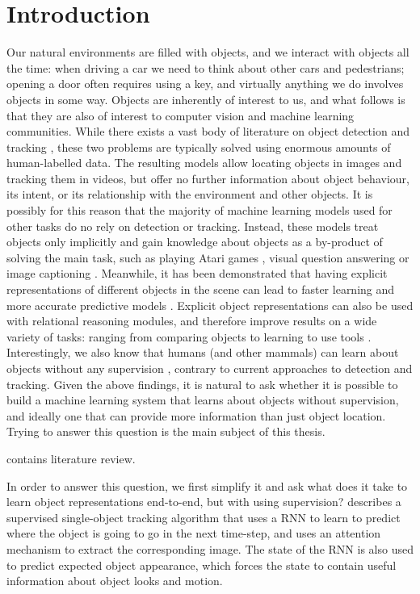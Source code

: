 \chapter{Introduction}
\label{ch:introduction}
%


	Our natural environments are filled with objects, and we interact with objects all the time: when driving a car we need to think about other cars and pedestrians; opening a door often requires using a key, and virtually anything we do involves objects in some way.
	Objects are inherently of interest to us, and what follows is that they are also of interest to computer vision and machine learning communities.
	While there exists a vast body of literature on object detection and tracking \addref, these two problems are typically solved using enormous amounts of human-labelled data. 
	The resulting models allow locating objects in images and tracking them in videos, but offer no further information about object behaviour, its intent, or its relationship with the environment and other objects.
	It is possibly for this reason that the majority of machine learning models used for other tasks do no rely on detection or tracking.
	Instead, these models treat objects only implicitly and gain knowledge about objects as a by-product of solving the main task, such as playing Atari games \citep{dqn}, visual question answering \citep{vqa} or image captioning \citep{image caption}.
	Meanwhile, it has been demonstrated that having explicit representations of different objects in the scene can lead to faster learning and more accurate predictive models \addref. 
 	Explicit object representations can also be used with relational reasoning modules, and therefore improve results on a wide variety of tasks: ranging from comparing objects \citep{Santoro2017} to learning to use tools \citep{hideandseek}.
 	Interestingly, we also know that humans (and other mammals) can learn about objects without any supervision \addref, contrary to current approaches to detection and tracking.
 	Given the above findings, it is natural to ask whether it is possible to build a machine learning system that learns about objects without supervision, and ideally one that can provide more information than just object location.
 	Trying to answer this question is the main subject of this thesis.
 	
 	 contains literature review.
 	
 	In order to answer this question, we first simplify it and ask what does it take to learn object representations end-to-end, but with using supervision?  describes a supervised single-object tracking algorithm that uses a \gls{RNN} to learn to predict where the object is going to go in the next time-step, and uses an attention mechanism to extract the corresponding image.
 	The state of the \gls{RNN} is also used to predict expected object appearance, which forces the state to contain useful information about object looks and motion.
 	
